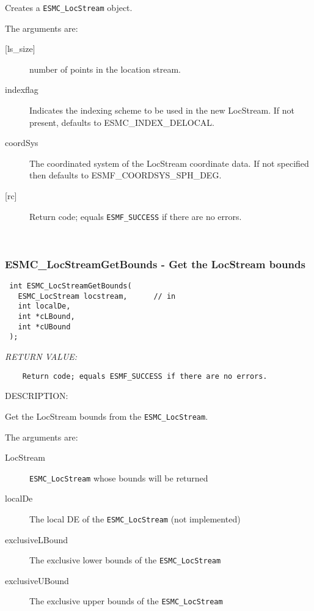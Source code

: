   
    Creates a {\tt ESMC\_LocStream} object.
  
    The arguments are:
    \begin{description}
    \item[{[ls_size]}]
      number of points in the location stream.
    \item[indexflag]
      Indicates the indexing scheme to be used in the new LocStream. If not present,
      defaults to ESMC\_INDEX\_DELOCAL.
    \item[coordSys]
      The coordinated system of the LocStream coordinate data. If not specified then
      defaults to ESMF\_COORDSYS\_SPH\_DEG.
    \item[{[rc]}]
      Return code; equals {\tt ESMF\_SUCCESS} if there are no errors.
    \end{description}
   
 
\mbox{}\hrulefill\ 
 
\subsubsection [ESMC\_LocStreamGetBounds] {ESMC\_LocStreamGetBounds - Get the LocStream bounds}


  
\begin{verbatim} int ESMC_LocStreamGetBounds(
   ESMC_LocStream locstream,      // in
   int localDe,
   int *cLBound,
   int *cUBound
 );
 \end{verbatim}{\em RETURN VALUE:}
\begin{verbatim}    Return code; equals ESMF_SUCCESS if there are no errors.\end{verbatim}
{\sf DESCRIPTION:\\ }


  
    Get the LocStream bounds from the {\tt ESMC\_LocStream}.
  
    The arguments are:
    \begin{description}
    \item[LocStream]
      {\tt ESMC\_LocStream} whose bounds will be returned
    \item[localDe]
      The local DE of the {\tt ESMC\_LocStream} (not implemented)
    \item[exclusiveLBound]
      The exclusive lower bounds of the {\tt ESMC\_LocStream}
    \item[exclusiveUBound]
      The exclusive upper bounds of the {\tt ESMC\_LocStream}
    \end{description}
   
